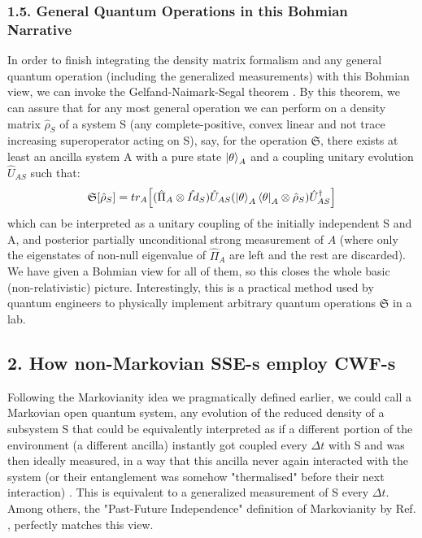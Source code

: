 \documentclass[11pt, a4paper]{article} %
\begin{document}
\subsubsection*{1.5. General Quantum Operations in this Bohmian Narrative}\vspace{-0.2cm}

In order to finish integrating the density matrix formalism and any general quantum operation (including the generalized measurements) with this Bohmian view, we can invoke the Gelfand-Naimark-Segal theorem \cite{GNSTheorem, Generalized}. By this theorem, we can assure that for any most general operation we can perform on a density matrix $\hat{\rho}_S$ of a system S (any complete-positive, convex linear and not trace increasing superoperator acting on S), say, for the operation $\mathfrak{S}$, there exists at least an ancilla system A with a pure state $\ket{\theta}_A$ and a coupling unitary evolution $\hat{U}_{AS}$ such that:\vspace{-0.15cm}
\begin{equation}
\mathfrak{S}[\hat{\rho}_S]=tr_A\qty[ (\hat{\Pi}_A\otimes \hat{Id}_S)  \hat{U}_{AS}\qty(\ket{\theta}_A\bra{\theta}_A\otimes \hat{\rho}_S)\hat{U}_{AS}^\dagger]
\end{equation}
which can be interpreted as a unitary coupling of the initially independent S and A, and posterior partially unconditional strong measurement of $A$ (where only the eigenstates of non-null eigenvalue of $\hat{\Pi}_A$ are left and the rest are discarded). We have given a Bohmian view for all of them, so this closes the whole basic (non-relativistic) picture. Interestingly, this is a practical method used by quantum engineers to physically implement arbitrary quantum operations $\mathfrak{S}$ in a lab.\vspace{-0.1cm}


\subsection*{2. How non-Markovian SSE-s employ CWF-s}
Following the Markovianity idea we pragmatically defined earlier, we could call a Markovian open quantum system, any evolution of the reduced density of a subsystem S that could be equivalently interpreted as if a different portion of the environment (a different ancilla) instantly got coupled every $\Delta t$ with S and was then ideally measured, in a way that this ancilla never again interacted with the system (or their entanglement was somehow "thermalised" before their next interaction) \cite{QuantumTrajs}. This is equivalent to a generalized measurement of S every $\Delta t$. Among others, the "Past-Future Independence" definition of Markovianity by Ref. \cite{MarkovianityDefs}, perfectly matches this view.
\end{document}
